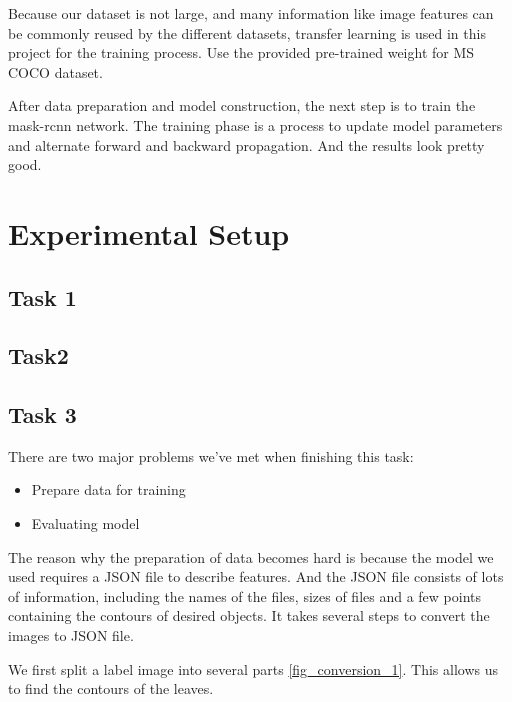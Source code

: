 \documentclass[conference]{IEEEtran}
\begin{document}
Because our dataset is not large, and many information like image features can be commonly reused by the different datasets, 
transfer learning \cite{pan2009survey} is used in this project for the training process.
Use the provided pre-trained weight for MS COCO dataset\cite{Lin_2014}.

After data preparation and model construction, the next step is to train the mask-rcnn network.
The training phase is a process to update model parameters and alternate forward and backward propagation.
And the results look pretty good.

\section{Experimental Setup}
\subsection{Task 1}

\subsection{Task2}

\subsection{Task 3}

There are two major problems we've met when finishing this task: 
\begin{itemize}
\item Prepare data for training
\item Evaluating model
\end{itemize}
The reason why the preparation of data becomes hard is because the model we used requires a JSON file to describe features. And the JSON file consists of lots of information, including the names of the files, sizes of files and a few points containing the contours of desired objects. It takes several steps to convert the images to JSON file. 

We first split a label image into several parts \ref{fig_conversion_1}. This allows us to find the contours of the leaves.
\end{document}
